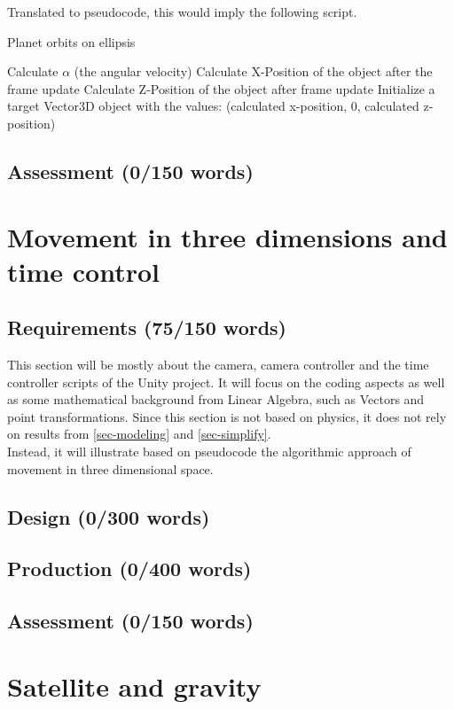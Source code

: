 \documentclass[conference,compsoc]{IEEEtran}
\begin{document}
Translated to pseudocode, this would imply the following script.
\begin{algorithm}
	\caption{Planet orbits on ellipsis}
	\begin{algorithmic}
			\State Calculate $\alpha$ (the angular velocity)
			\State Calculate X-Position of the object after the frame update
			\State Calculate Z-Position of the object after frame update
			\Statex Initialize a target Vector3D object with the values: (calculated x-position, 0, calculated z-position)
		\EndFor
	\end{algorithmic}
\end{algorithm}

\subsection{Assessment (0/150 words)}

\section{Movement in three dimensions and time control}
\label{sec-movement-in-3D}
\subsection{Requirements (75/150 words)}
This section will be mostly about the camera, camera controller and the time controller scripts of the Unity project. It will focus on the coding aspects as well as some mathematical background from Linear Algebra, such as Vectors and point transformations. Since this section is not based on physics, it does not rely on results from \ref{sec-modeling} and \ref{sec-simplify}.\\
Instead, it will illustrate based on pseudocode the algorithmic approach of movement in three dimensional space. \\

\subsection{Design (0/300 words)}
\subsection{Production (0/400 words)}
\subsection{Assessment (0/150 words)}
\section{Satellite and gravity}
\label{sec-satellite-gravity}
\end{document}
